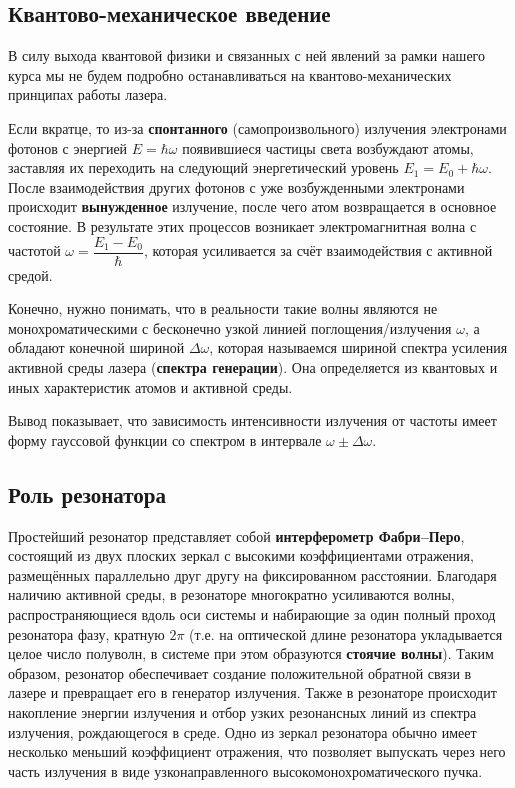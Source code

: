 \documentclass[12pt]{kiarticle}
\begin{document}
\subsection{Квантово-механическое введение}

В силу выхода квантовой физики и связанных с ней явлений за рамки нашего курса мы не будем подробно останавливаться на квантово-механических принципах работы лазера.

Если вкратце, то из-за \textbf{спонтанного} (самопроизвольного) излучения электронами фотонов с энергией $ E = \hbar \omega $ появившиеся частицы света возбуждают атомы, заставляя их переходить на следующий энергетический уровень $ E_1 = E_0 + \hbar \omega $. После взаимодействия других фотонов с уже возбужденными электронами происходит \textbf{вынужденное} излучение, после чего атом возвращается в основное состояние. В результате этих процессов возникает электромагнитная волна с частотой $ \omega = \dfrac{E_1 - E_0}{\hbar} $, которая усиливается за счёт взаимодействия с активной средой.  

Конечно, нужно понимать, что в реальности такие волны являются не монохроматическими с бесконечно узкой линией поглощения/излучения $ \omega $, а обладают конечной шириной $ \Delta \omega $, которая называемся шириной спектра усиления активной среды лазера (\textbf{спектра генерации}). Она определяется из квантовых и иных характеристик атомов и активной среды.

Вывод показывает, что зависимость интенсивности излучения от частоты имеет форму гауссовой функции со спектром в интервале $ \omega \pm \Delta \omega $.

\subsection{Роль резонатора}

Простейший резонатор представляет собой \textbf{интерферометр
Фабри–Перо}, состоящий из двух плоских зеркал с
высокими коэффициентами отражения, размещённых параллельно друг другу на фиксированном расстоянии. Благодаря наличию
активной среды, в резонаторе многократно усиливаются волны, распространяющиеся вдоль оси системы и набирающие за один полный
проход резонатора фазу, кратную $ 2\pi $ (т.е. на оптической длине резонатора укладывается целое число полуволн, в системе при этом
образуются \textbf{стоячие волны}). Таким образом, резонатор обеспечивает
создание положительной обратной связи в лазере и превращает его
в генератор излучения. Также в резонаторе происходит накопление
энергии излучения и отбор узких резонансных линий из спектра
излучения, рождающегося в среде. Одно из зеркал резонатора обычно
имеет несколько меньший коэффициент отражения, что позволяет
выпускать через него часть излучения в виде узконаправленного
высокомонохроматического пучка.
\end{document}
